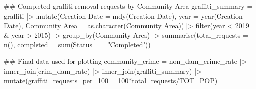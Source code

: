 \documentclass[
]{report}
\newenvironment{Shaded}{}{}
\newcommand{\AttributeTok}[1]{\textcolor[rgb]{0.65,0.15,0.64}{#1}}
\newcommand{\DecValTok}[1]{\textcolor[rgb]{0.60,0.41,0.00}{#1}}
\newcommand{\DocumentationTok}[1]{\textcolor[rgb]{0.89,0.34,0.29}{#1}}
\newcommand{\FunctionTok}[1]{\textcolor[rgb]{0.25,0.47,0.95}{#1}}
\newcommand{\NormalTok}[1]{\textcolor[rgb]{0.22,0.23,0.26}{#1}}
\newcommand{\OtherTok}[1]{\textcolor[rgb]{0.15,0.68,0.38}{#1}}
\newcommand{\SpecialCharTok}[1]{\textcolor[rgb]{0.00,0.52,0.74}{#1}}
\newcommand{\StringTok}[1]{\textcolor[rgb]{0.31,0.63,0.31}{#1}}
\begin{document}
\begin{Shaded}
\begin{Highlighting}[]
\DocumentationTok{\#\# Completed graffiti removal requests by Community Area}
\NormalTok{graffiti\_summary }\OtherTok{=}\NormalTok{ graffiti }\SpecialCharTok{|\textgreater{}} 
  \FunctionTok{mutate}\NormalTok{(}\StringTok{\textasciigrave{}}\AttributeTok{Creation Date}\StringTok{\textasciigrave{}} \OtherTok{=} \FunctionTok{mdy}\NormalTok{(}\StringTok{\textasciigrave{}}\AttributeTok{Creation Date}\StringTok{\textasciigrave{}}\NormalTok{),}
         \AttributeTok{year =} \FunctionTok{year}\NormalTok{(}\StringTok{\textasciigrave{}}\AttributeTok{Creation Date}\StringTok{\textasciigrave{}}\NormalTok{),}
         \StringTok{\textasciigrave{}}\AttributeTok{Community Area}\StringTok{\textasciigrave{}} \OtherTok{=} \FunctionTok{as.character}\NormalTok{(}\StringTok{\textasciigrave{}}\AttributeTok{Community Area}\StringTok{\textasciigrave{}}\NormalTok{)) }\SpecialCharTok{|\textgreater{}} 
  \FunctionTok{filter}\NormalTok{(year }\SpecialCharTok{\textless{}} \DecValTok{2019} \SpecialCharTok{\&}\NormalTok{ year }\SpecialCharTok{\textgreater{}} \DecValTok{2015}\NormalTok{) }\SpecialCharTok{|\textgreater{}} 
  \FunctionTok{group\_by}\NormalTok{(}\StringTok{\textasciigrave{}}\AttributeTok{Community Area}\StringTok{\textasciigrave{}}\NormalTok{) }\SpecialCharTok{|\textgreater{}} 
  \FunctionTok{summarise}\NormalTok{(}\AttributeTok{total\_requests =} \FunctionTok{n}\NormalTok{(),}
            \AttributeTok{completed =} \FunctionTok{sum}\NormalTok{(Status }\SpecialCharTok{==} \StringTok{"Completed"}\NormalTok{))}

\DocumentationTok{\#\# Final data used for plotting}
\NormalTok{community\_crime }\OtherTok{=}\NormalTok{ non\_dam\_crime\_rate }\SpecialCharTok{|\textgreater{}} 
  \FunctionTok{inner\_join}\NormalTok{(crim\_dam\_rate) }\SpecialCharTok{|\textgreater{}} 
  \FunctionTok{inner\_join}\NormalTok{(graffiti\_summary) }\SpecialCharTok{|\textgreater{}} 
  \FunctionTok{mutate}\NormalTok{(}\AttributeTok{graffiti\_requests\_per\_100 =} \DecValTok{100}\SpecialCharTok{*}\NormalTok{total\_requests}\SpecialCharTok{/}\NormalTok{TOT\_POP)}
\end{Highlighting}
\end{Shaded}
\end{document}
